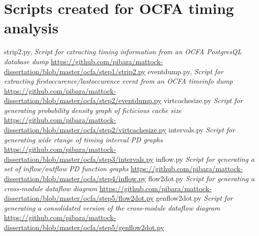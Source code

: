 \chapter{Scripts created for OCFA timing analysis}
\noindent 
\begin{thebibliography}{1}
 strip2.py, {\em Script for extracting timing information from an OCFA PostgresQL database dump}  \url{https://github.com/pibara/mattock-dissertation/blob/master/ocfa/step1/strip2.py}
 eventdump.py, {\em Script for extracting firstoccurence/lastoccurence event from an OCFA timeinfo dump} \url{https://github.com/pibara/mattock-dissertation/blob/master/ocfa/step2/eventdump.py}
 virtcachesize.py {\em Script for generating probability density graph of ficticious cache size}  \url{https://github.com/pibara/mattock-dissertation/blob/master/ocfa/step2/virtcachesize.py}
 intervals.py {\em Script for generating wide rtange of timing interval PD graphs}  \url{https://github.com/pibara/mattock-dissertation/blob/master/ocfa/step3/intervals.py}
 inflow.py {\em Script for generating a set of inflow/outflow PD function graphs}  \url{https://github.com/pibara/mattock-dissertation/blob/master/ocfa/step4/inflow.py}
 flow2dot.py {\em Script for generating a cross-module dataflow diagram} \url{https://github.com/pibara/mattock-dissertation/blob/master/ocfa/step5/flow2dot.py}
 genflow2dot.py {\em Script for generating a consolidated version of the cross-module dataflow diagram}  \url{https://github.com/pibara/mattock-dissertation/blob/master/ocfa/step5/genflow2dot.py}
\end{thebibliography}
